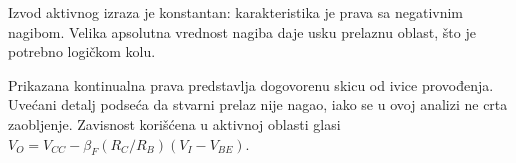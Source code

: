 Izvod aktivnog izraza je konstantan: karakteristika je prava sa negativnim nagibom. Velika apsolutna vrednost nagiba daje usku prelaznu oblast, što je potrebno logičkom kolu.

Prikazana kontinualna prava predstavlja dogovorenu skicu od ivice provođenja. Uvećani detalj podseća da stvarni prelaz nije nagao, iako se u ovoj analizi ne crta zaobljenje. Zavisnost korišćena u aktivnoj oblasti glasi $V_O=V_{CC}-\beta_F(R_C/R_B)(V_I-V_{BE})$.
